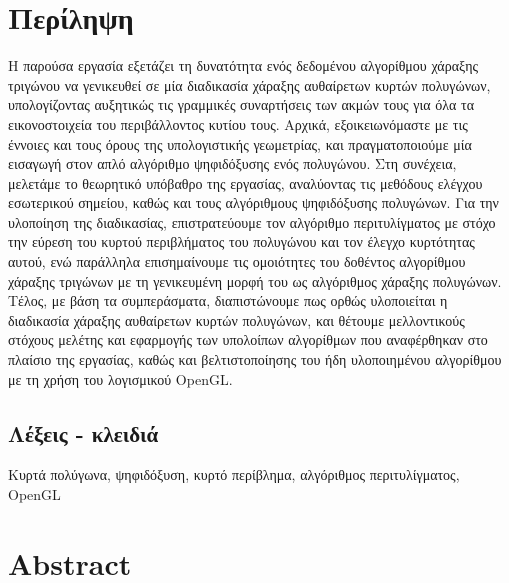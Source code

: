 
\chapter*{Περίληψη}

Η παρούσα εργασία εξετάζει τη δυνατότητα ενός δεδομένου αλγορίθμου χάραξης τριγώνου να γενικευθεί σε μία διαδικασία χάραξης αυθαίρετων κυρτών πολυγώνων, υπολογίζοντας αυξητικώς τις γραμμικές συναρτήσεις των ακμών τους για όλα τα εικονοστοιχεία του περιβάλλοντος κυτίου τους. Αρχικά, εξοικειωνόμαστε με τις έννοιες και τους όρους της υπολογιστικής γεωμετρίας, και πραγματοποιούμε μία εισαγωγή στον απλό αλγόριθμο ψηφιδόξυσης ενός πολυγώνου. Στη συνέχεια, μελετάμε το θεωρητικό υπόβαθρο της εργασίας, αναλύοντας τις μεθόδους ελέγχου εσωτερικού σημείου, καθώς και τους αλγόριθμους ψηφιδόξυσης πολυγώνων. Για την υλοποίηση της διαδικασίας, επιστρατεύουμε τον αλγόριθμο περιτυλίγματος με στόχο την εύρεση του κυρτού περιβλήματος του πολυγώνου και τον έλεγχο κυρτότητας αυτού, ενώ παράλληλα επισημαίνουμε τις ομοιότητες του δοθέντος αλγορίθμου χάραξης τριγώνων με τη γενικευμένη μορφή του ως αλγόριθμος χάραξης  πολυγώνων. Τέλος, με βάση τα συμπεράσματα, διαπιστώνουμε πως ορθώς υλοποιείται η διαδικασία χάραξης αυθαίρετων κυρτών πολυγώνων, και θέτουμε μελλοντικούς στόχους μελέτης και εφαρμογής των υπολοίπων αλγορίθμων που αναφέρθηκαν στο πλαίσιο της εργασίας, καθώς και βελτιστοποίησης του ήδη υλοποιημένου αλγορίθμου με τη χρήση του λογισμικού \textlatin{OpenGL}.

\vspace{1.5em}

\section*{Λέξεις - κλειδιά}
Κυρτά πολύγωνα, ψηφιδόξυση, κυρτό περίβλημα, αλγόριθμος περιτυλίγματος, \textlatin{OpenGL}

\newpage

\chapter*{\textlatin{Abstract}}

